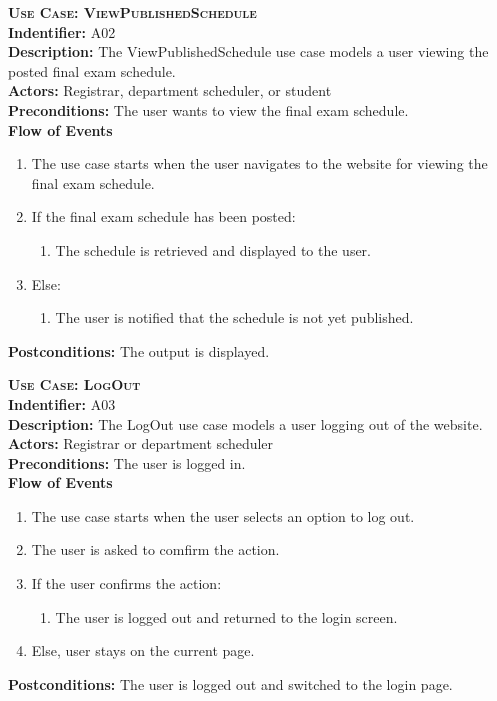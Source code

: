 \documentclass[11pt]{article}
\newcounter{id}
\newenvironment{usecase}{%
	\def\title##1{ {\large \bfseries  \scshape {Use Case:} ##1} \\ }
 	\def\id##1{{\bf Indentifier:} ##1\\}
	\def\des##1{ {\bf Description:} ##1\\}
	\def\actors##1{ {\bf Actors:} ##1\\}
    	\def\pre##1{ {\bf Preconditions:} ##1 \\} %
    	\def\flow##1{ {\bf Flow of Events} ##1}%
    	\newenvironment{ucenum}{%
        	\begin{enumerate}[nolistsep]\small}%
        	{\end{enumerate}}
	\def\post##1{ {\bf Postconditions:} ##1 \\}
}{\vspace{.05in}}
\begin{document}
\begin{usecase}
  \title{ViewPublishedSchedule}
  \id{A02}
  \des{The ViewPublishedSchedule use case models a user viewing the posted final exam schedule.}
  \actors{Registrar, department scheduler, or student}
  \pre{The user wants to view the final exam schedule.}
  \flow{}
  \begin{ucenum}
  \item The use case starts when the user navigates to the website for viewing the final exam schedule.
  \item If the final exam schedule has been posted:
    \begin{ucenum} \item The schedule is retrieved and displayed to the user. \end{ucenum}
  \item Else:
    \begin{ucenum} \item The user is notified that the schedule is not yet published. \end{ucenum}
  \end{ucenum}
  \post{The output is displayed.}
\end{usecase}

\begin{usecase}
  \title{LogOut}
  \id{A03}
  \des{The LogOut use case models a user logging out of the website.}
  \actors{Registrar or department scheduler}
  \pre{The user is logged in.}
  \flow{}
  \begin{ucenum}
  \item The use case starts when the user selects an option to log out.
  \item The user is asked to comfirm the action.
  \item If the user confirms the action:
    \begin{ucenum}
    \item The user is logged out and returned to the login screen.
    \end{ucenum}
  \item Else, user stays on the current page.
  \end{ucenum}
  \post{The user is logged out and switched to the login page.}
\end{usecase}
\end{document}
